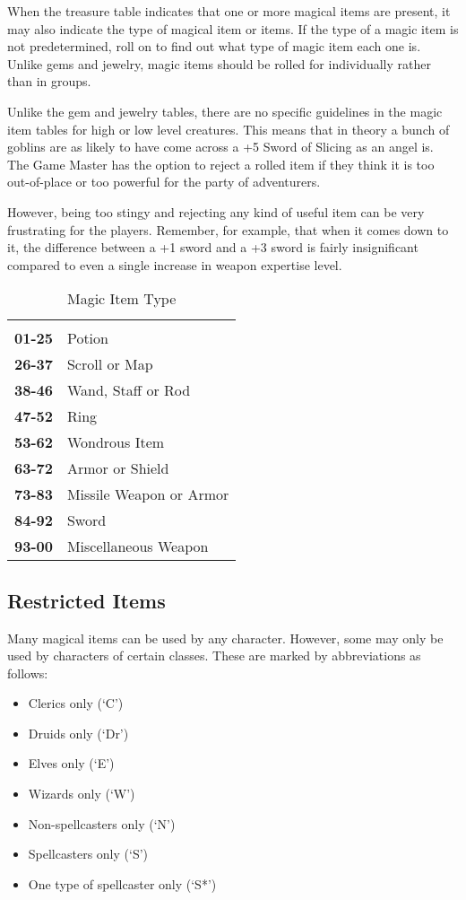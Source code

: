 \begin{multicols*}{2}
When the treasure table indicates that one or more magical items are present, it may also indicate the type of magical item or items. If the type of a magic item is not predetermined, roll on  to find out what type of magic item each one is. Unlike gems and jewelry, magic items should be rolled for individually rather than in groups.

Unlike the gem and jewelry tables, there are no specific guidelines in the magic item tables for high or low level creatures. This means that in theory a bunch of goblins are as likely to have come across a +5 Sword of Slicing as an angel is. The Game Master has the option to reject a rolled item if they think it is too out-of-place or too powerful for the party of adventurers.

However, being too stingy and rejecting any kind of useful item can be very frustrating for the players. Remember, for example, that when it comes down to it, the difference between a +1 sword and a +3 sword is fairly insignificant compared to even a single increase in weapon expertise level.

\begin {table}[H]
  \caption{Magic Item Type}\label{tab:Magic Item Type}
  \begin{tabularx}{\columnwidth}{>{\bfseries}YY}
	 & \\
	01-25 & Potion\\
	26-37 & Scroll or Map\\
	38-46 & Wand, Staff or Rod\\
	47-52 & Ring\\
	53-62 & Wondrous Item\\
	63-72 & Armor or Shield\\
	73-83 & Missile Weapon or Armor\\
	84-92 & Sword\\
	93-00 & Miscellaneous Weapon
  \end {tabularx}
\end {table}

\subsection{Restricted Items}
Many magical items can be used by any character. However, some may only be used by characters of certain classes. These are marked by abbreviations as follows:

\begin{itemize}
 \item{Clerics only (‘C’)}
 \item{Druids only (‘Dr’)}
 \item{Elves only (‘E’)}
 \item{Wizards only (‘W’)}
 \item{Non-spellcasters only (‘N’)}
 \item{Spellcasters only (‘S’)}
 \item{One type of spellcaster only (‘S*’)}
\end{itemize}


\end{multicols*}
